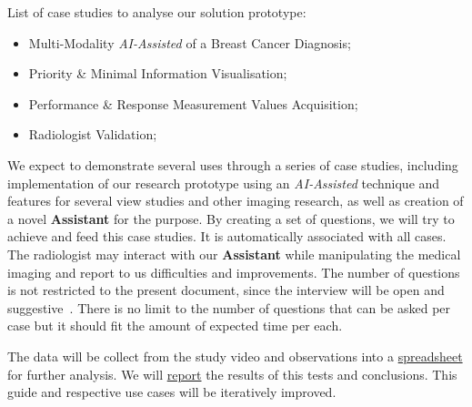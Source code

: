 \hfill

List of case studies to analyse our solution prototype:

\hfill

\begin{itemize}
\item Multi-Modality \textit{AI-Assisted} of a Breast Cancer Diagnosis;
\item Priority \& Minimal Information Visualisation;
\item Performance \& Response Measurement Values Acquisition;
\item Radiologist Validation;
\end{itemize}

\hfill


We expect to demonstrate several uses through a series of case studies, including implementation of our research prototype using an \textit{AI-Assisted} technique and features for several view studies and other imaging research, as well as creation of a novel \textbf{Assistant} for the purpose. By creating a set of questions, we will try to achieve and feed this case studies. It is automatically associated with all cases. The radiologist may interact with our \textbf{Assistant} while manipulating the medical imaging and report to us difficulties and improvements. The number of questions is not restricted to the present document, since the interview will be open and suggestive~\cite{joyce2017healthcare}. There is no limit to the number of questions that can be asked per case but it should fit the amount of expected time per each.

The data will be collect from the study video and observations into a \hyperlink{https://docs.google.com/spreadsheets/d/1CoPLONnINdBWryGs7SBRuPZA-DnQ0t_yzx3u8ym0UoI/edit?usp=sharing}{spreadsheet} for further analysis. We will \hyperlink{https://github.com/mida-project/research-reports}{report} the results of this tests and conclusions. This guide and respective use cases will be iteratively improved.

























